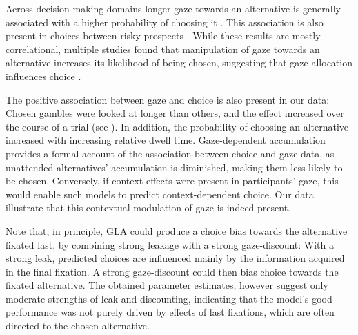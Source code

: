 \documentclass[11pt, a4paper]{article}
\begin{document}
Across decision making domains longer gaze towards an alternative is generally associated with a higher probability of choosing it \autocite{armel2008BiasingSimpleChoices,ashby2016FindingRightFit,cavanagh2014EyeTrackingPupillometry,folke2016ExplicitRepresentationConfidence,gluth2020ValuebasedAttentionNot,krajbich2010VisualFixationsComputation,krajbich2011MultialternativeDriftdiffusionModel,shimojo2003GazeBiasBoth,smith2018AttentionChoiceDomains,tavares2017AttentionalDriftDiffusion,towal2013SimultaneousModelingVisual,vaidya2015TestingNecessaryRegional}. This association is also present in choices between risky prospects \autocite{fiedler2012DynamicsDecisionMaking,glickman2019FormationPreferenceRisky,smith2018AttentionChoiceDomains,stewart2016EyeMovementsRisky}. While these results are mostly correlational, multiple studies found that manipulation of gaze towards an alternative increases its likelihood of being chosen, suggesting that gaze allocation influences choice \autocite{armel2008BiasingSimpleChoices,liu2020ExploitingDynamicsEye,parnamets2015BiasingMoralDecisions,shimojo2003GazeBiasBoth,sui2020TimingGazecontingentDecision,tavares2017AttentionalDriftDiffusion}.

The positive association between gaze and choice is also present in our data: Chosen gambles were looked at longer than others, and the effect increased over the course of a trial (see ). In addition, the probability of choosing an alternative increased with increasing relative dwell time. Gaze-dependent accumulation provides a formal account of the association between choice and gaze data, as unattended alternatives’ accumulation is diminished, making them less likely to be chosen. Conversely, if context effects were present in participants’ gaze, this would enable such models to predict context-dependent choice. Our data illustrate that this contextual modulation of gaze is indeed present.

Note that, in principle, GLA could produce a choice bias towards the alternative fixated last, by combining strong leakage with a strong gaze-discount: With a strong leak, predicted choices are influenced mainly by the information acquired in the final fixation. A strong gaze-discount could then bias choice towards the fixated alternative. The obtained parameter estimates, however suggest only moderate strengths of leak and discounting, indicating that the model’s good performance was not purely driven by effects of last fixations, which are often directed to the chosen alternative.  
\end{document}
